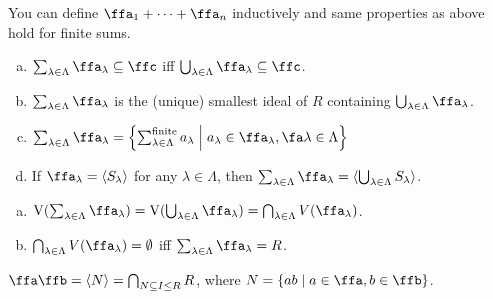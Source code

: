 \begin{remark}
    You can define $\ffa_1 + \cdots + \ffa_n$ inductively and same properties as above hold for finite sums.
\end{remark}

\begin{remark}[Fact]
    \begin{enumerate}[(a)]
        \item $\sum_{\lambda \in \Lambda} \ffa_\lambda \subseteq \ffc$ iff $\bigcup_{\lambda \in \Lambda} \ffa_\lambda \subseteq \ffc$.
        \item $\sum_{\lambda \in \Lambda} \ffa_\lambda$ is the (unique) smallest ideal of $R$ containing $\bigcup_{\lambda \in \Lambda} \ffa_\lambda$.
        \item $\sum_{\lambda \in \Lambda} \ffa_\lambda = \left\{\sum_{\lambda \in \Lambda}^{\text{finite}}a_\lambda \mathrel{\Big |} a_\lambda \in \ffa_\lambda, \fa \lambda \in \Lambda\right\}$
        \item If $\ffa_\lambda = \langle S_\lambda \rangle$ for any $\lambda \in \Lambda$, then $\sum_{\lambda \in \Lambda} \ffa_\lambda = \langle \bigcup_{\lambda \in \Lambda}S_\lambda \rangle$.
    \end{enumerate}
\end{remark}

\begin{remark}[Fact]
    \begin{enumerate}[(a)]
        \item $\operatorname{V}(\sum_{\lambda \in \Lambda} \ffa_\lambda) = \operatorname{V}(\bigcup_{\lambda \in \Lambda} \ffa_\lambda) = \bigcap_{\lambda \in \Lambda} V(\ffa_\lambda)$.
        \item $\bigcap_{\lambda \in \Lambda}V(\ffa_\lambda) = \emptyset$ iff $\sum_{\lambda \in \Lambda} \ffa_\lambda = R$.
    \end{enumerate}
\end{remark}

\begin{definition}
    $\ffa \ffb = \langle N \rangle = \bigcap_{N \subseteq I \leq R}R$, where $N = \{ab \mid a \in \ffa,b \in \ffb\}$. 
\end{definition}

